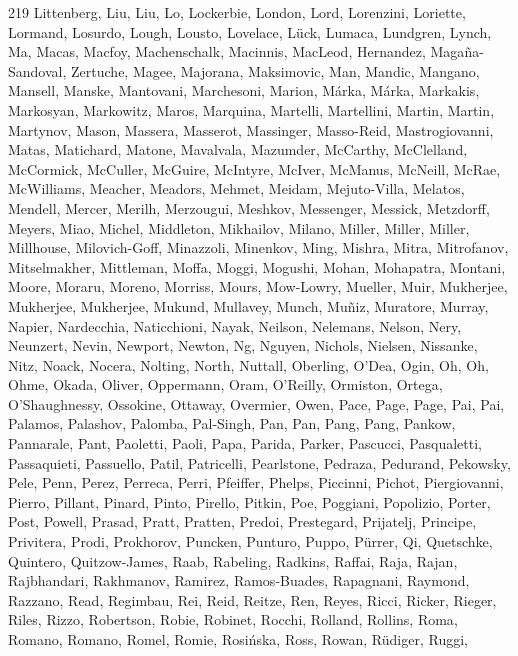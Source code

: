 \documentclass{aa}
\begin{document}
\begin{thebibliography}{219}
{		{Littenberg}, {Liu}, {Liu}, {Lo}, {Lockerbie}, {London}, {Lord}, {Lorenzini}, {Loriette}, {Lormand}, {Losurdo}, {Lough}, {Lousto}, {Lovelace}, {L{\"u}ck}, {Lumaca}, {Lundgren}, {Lynch}, {Ma}, {Macas}, {Macfoy}, {Machenschalk}, {Macinnis}, {MacLeod}, {Hernandez}, {Maga{\~n}a-Sandoval}, {Zertuche}, {Magee}, {Majorana}, {Maksimovic}, {Man}, {Mandic}, {Mangano}, {Mansell}, {Manske}, {Mantovani}, {Marchesoni}, {Marion}, {M{\'a}rka}, {M{\'a}rka}, {Markakis}, {Markosyan}, {Markowitz}, {Maros}, {Marquina}, {Martelli}, {Martellini}, {Martin}, {Martin}, {Martynov}, {Mason}, {Massera}, {Masserot}, {Massinger}, {Masso-Reid}, {Mastrogiovanni}, {Matas}, {Matichard}, {Matone}, {Mavalvala}, {Mazumder}, {McCarthy}, {McClelland}, {McCormick}, {McCuller}, {McGuire}, {McIntyre}, {McIver}, {McManus}, {McNeill}, {McRae}, {McWilliams}, {Meacher}, {Meadors}, {Mehmet}, {Meidam}, {Mejuto-Villa}, {Melatos}, {Mendell}, {Mercer}, {Merilh}, {Merzougui}, {Meshkov}, {Messenger}, {Messick}, {Metzdorff}, {Meyers}, {Miao}, {Michel},
		{Middleton}, {Mikhailov}, {Milano}, {Miller}, {Miller}, {Miller}, {Millhouse}, {Milovich-Goff}, {Minazzoli}, {Minenkov}, {Ming}, {Mishra}, {Mitra}, {Mitrofanov}, {Mitselmakher}, {Mittleman}, {Moffa}, {Moggi}, {Mogushi}, {Mohan}, {Mohapatra}, {Montani}, {Moore}, {Moraru}, {Moreno}, {Morriss}, {Mours}, {Mow-Lowry}, {Mueller}, {Muir}, {Mukherjee}, {Mukherjee}, {Mukherjee}, {Mukund}, {Mullavey}, {Munch}, {Mu{\~n}iz}, {Muratore}, {Murray}, {Napier}, {Nardecchia}, {Naticchioni}, {Nayak}, {Neilson}, {Nelemans}, {Nelson}, {Nery}, {Neunzert}, {Nevin}, {Newport}, {Newton}, {Ng}, {Nguyen}, {Nichols}, {Nielsen}, {Nissanke}, {Nitz}, {Noack}, {Nocera}, {Nolting}, {North}, {Nuttall}, {Oberling}, {O'Dea}, {Ogin}, {Oh}, {Oh}, {Ohme}, {Okada}, {Oliver}, {Oppermann}, {Oram}, {O'Reilly}, {Ormiston}, {Ortega}, {O'Shaughnessy}, {Ossokine}, {Ottaway}, {Overmier}, {Owen}, {Pace}, {Page}, {Page}, {Pai}, {Pai}, {Palamos}, {Palashov}, {Palomba}, {Pal-Singh}, {Pan}, {Pan}, {Pang}, {Pang}, {Pankow}, {Pannarale}, {Pant}, {Paoletti},
		{Paoli}, {Papa}, {Parida}, {Parker}, {Pascucci}, {Pasqualetti}, {Passaquieti}, {Passuello}, {Patil}, {Patricelli}, {Pearlstone}, {Pedraza}, {Pedurand}, {Pekowsky}, {Pele}, {Penn}, {Perez}, {Perreca}, {Perri}, {Pfeiffer}, {Phelps}, {Piccinni}, {Pichot}, {Piergiovanni}, {Pierro}, {Pillant}, {Pinard}, {Pinto}, {Pirello}, {Pitkin}, {Poe}, {Poggiani}, {Popolizio}, {Porter}, {Post}, {Powell}, {Prasad}, {Pratt}, {Pratten}, {Predoi}, {Prestegard}, {Prijatelj}, {Principe}, {Privitera}, {Prodi}, {Prokhorov}, {Puncken}, {Punturo}, {Puppo}, {P{\"u}rrer}, {Qi}, {Quetschke}, {Quintero}, {Quitzow-James}, {Raab}, {Rabeling}, {Radkins}, {Raffai}, {Raja}, {Rajan}, {Rajbhandari}, {Rakhmanov}, {Ramirez}, {Ramos-Buades}, {Rapagnani}, {Raymond}, {Razzano}, {Read}, {Regimbau}, {Rei}, {Reid}, {Reitze}, {Ren}, {Reyes}, {Ricci}, {Ricker}, {Rieger}, {Riles}, {Rizzo}, {Robertson}, {Robie}, {Robinet}, {Rocchi}, {Rolland}, {Rollins}, {Roma}, {Romano}, {Romano}, {Romel}, {Romie}, {Rosi{\'n}ska}, {Ross}, {Rowan}, {R{\"u}diger}, {Ruggi},
}
\end{thebibliography}
\end{document}
